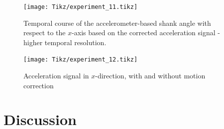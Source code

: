 \begin{figure}
	\centering
	\setlength\figureheight{7cm} 
	\setlength\figurewidth{\textwidth}
	\texttt{[image: Tikz/experiment\_11.tikz]}
	\caption{Temporal course of the accelerometer-based shank angle with respect to the $x$-axis based on the corrected acceleration signal - higher temporal resolution.}
	\label{fig:experiment_11}
\end{figure}

\begin{figure}
	\centering
	\setlength\figureheight{7cm} 
	\setlength\figurewidth{\textwidth}
	\texttt{[image: Tikz/experiment\_12.tikz]}
	\caption{Acceleration signal in $x$-direction, with and without motion correction}
	\label{fig:experiment_12}
\end{figure}


%

\section{Discussion}

